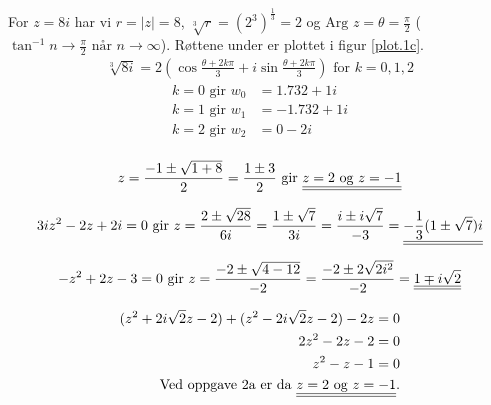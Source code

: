 \documentclass[a4paper,norsk,12pt]{article}
\begin{document}
For $z=8i$ har vi $r = |z| = 8$, $\sqrt[3]{r} = (2^3)^\frac{1}{3} = 2$ og
$\text{Arg }z = \theta = \frac{\pi}{2}$ ($\tan^{-1}{n} \to \frac{\pi}{2} \text{ når } n \to
\infty$). Røttene under er plottet i figur \vref{plot.1c}.
%
\begin{equation*}
\begin{split}
  \sqrt[3]{8i} = 2\left( \cos{\frac{\theta+2k\pi}{3}} +
  i\sin{\frac{\theta+2k\pi}{3}} \right) \text{ for } k = 0, 1, 2
\end{split}
\end{equation*}
%
\begin{equation*}
\begin{split}
  k = 0 \text{ gir } w_0 & = 1.732 + 1i \\
  k = 1 \text{ gir } w_1 & = -1.732 + 1i \\
  k = 2 \text{ gir } w_2 & = 0 - 2i \\
\end{split}
\end{equation*}

\begin{equation*}
\begin{split}
  z = \frac{-1 \pm \sqrt{1+8}}{2} = \frac{1\pm 3}{2}
  \text{ gir } {\underline{\underline{z=2 \text{ og } z=-1}}}
\end{split}
\end{equation*}

\begin{equation*}
\begin{split}
  3iz^2 - 2z + 2i = 0 \text{ gir }
  z = \frac{2 \pm \sqrt{28}}{6i}
    = \frac{1 \pm \sqrt{7}}{3i}
    = \frac{i \pm i\sqrt{7}}{-3}
    = \svar{-\frac{1}{3}(1 \pm \sqrt{7})i} \\
\end{split}
\end{equation*}

\begin{equation*}
\begin{split}
  -z^2+2z-3=0 \text{ gir }
   z = \frac{-2 \pm \sqrt{4-12}}{-2}
    = \frac{-2 \pm 2\sqrt{2i^2}}{-2}
    = {\underline{\underline{1 \mp i\sqrt{2}}}}
\end{split}
\end{equation*}

\begin{equation*}
\begin{split}
  (z^2+2i\sqrt{2}z-2) +
  (z^2-2i\sqrt{2}z-2) - 2z = 0 \\
  2z^2 - 2z - 2 = 0 \\
  z^2 - z - 1 = 0 \\
  \text{Ved oppgave 2a er da } {\underline{\underline{z=2 \text{ og } z=-1}}}.
\end{split}
\end{equation*}
\end{document}
